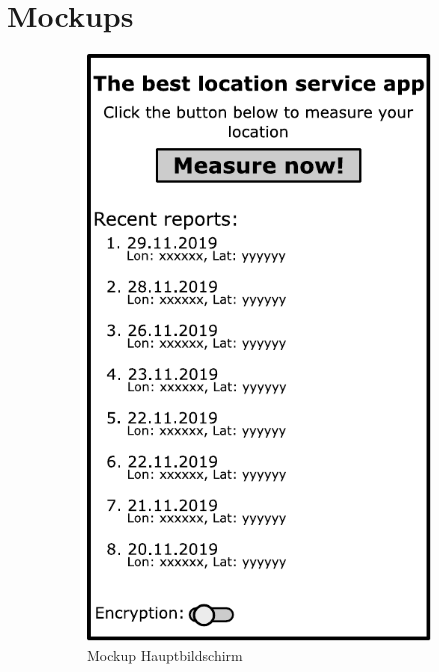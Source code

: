\section{Mockups}
\begin{figure}[H]
	\centering
	\begin{subfigure}{.4\textwidth}
		\centering
		\includegraphics[width=.7\textwidth]{graphics/mockupmainfragment}
		\caption{Mockup Hauptbildschirm}
		\label{fig:mockHaupt}
	\end{subfigure}
	\begin{subfigure}{.4\textwidth}
		\centering

\end{subfigure}
\end{figure}
